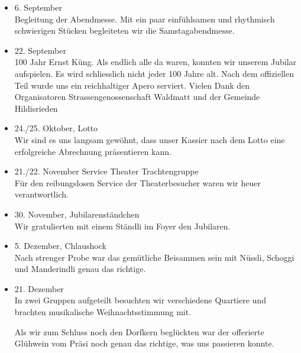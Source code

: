 \begin{history}
\begin{itemize}
        \item[]6. September\\
        Begleitung der Abendmesse. Mit ein paar einfühlsamen und rhythmisch
        schwierigen Stücken begleiteten wir die Samstagabendmesse.

        \item[]22. September\\
        100 Jahr Ernst Küng. Als endlich alle da waren, konnten wir unserem
        Jubilar aufspielen. Es wird schliesslich nicht jeder 100 Jahre alt. Nach
        dem offiziellen Teil wurde uns ein reichhaltiger Apero serviert. Vielen
        Dank den Organisatoren Strassengenossenschaft Waldmatt und der Gemeinde
        Hildisrieden

        \item[]24./25. Oktober, Lotto\\
        Wir sind es uns langsam gewöhnt, dass unser Kassier nach dem Lotto eine
        erfolgreiche Abrechnung präsentieren kann.

        \item[]21./22. November Service Theater Trachtengruppe\\
        Für den reibungslosen Service der Theaterbesucher waren wir heuer
        verantwortlich.

        \item[]30. November, Jubilarenständchen\\
        Wir gratulierten mit einem Ständli im Foyer den
        Jubilaren.

        \item[]5. Dezember, Chlaushock\\
        Nach strenger Probe war das gemütliche Beisammen sein mit
        Nüssli, Schoggi und Manderindli genau das richtige.

        \item[]21. Dezember\\
        In zwei Gruppen aufgeteilt besuchten wir verschiedene Quartiere und
        brachten musikalische Weihnachtsstimmung mit.

        Als wir zum Schluss noch den Dorfkern beglückten war der offerierte
        Glühwein vom Präsi noch genau das richtige, was uns passieren konnte.

    \end{itemize}

\end{history}
